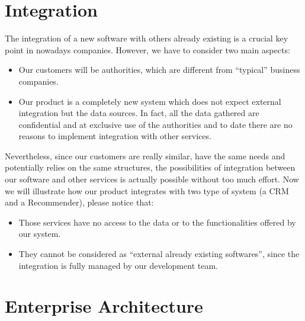 \documentclass[../main.tex]{subfiles}
\begin{document}
    \section{Integration}
    The integration of a new software with others already existing is a crucial key point in nowadays companies.
    However, we have to consider two main aspects:
    \begin{itemize}
        \item Our customers will be authorities, which are different from “typical” business companies.
        \item Our product is a completely new system which does not expect external integration but the data sources. In fact, all the data gathered are confidential and at exclusive use of the authorities and to date there are no reasons to implement integration with other services.
    \end{itemize}
    Nevertheless, since our customers are really similar, have the same needs and potentially relies on the same structures, the possibilities of integration between our software and other services is actually possible without too much effort.
    Now we will illustrate how our product integrates with two type of system (a CRM and a Recommender), please notice that:
    \begin{itemize}
        \item Those services have no access to the data or to the functionalities offered by our system.
        \item They cannot be considered as “external already existing softwares”, since the integration is fully managed by our development team.
    \end{itemize}

    \section{Enterprise Architecture}
\end{document}
